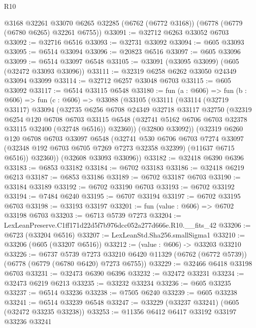 \begin{lexlean}{R10}
\begin{coremodule}
    @3168
    @32261
    @33070
    @6265
    @32285
    (@6762 (@6772 @3168))
    (@6778 (@6779 (@6780 @6265) @32261 @6755))
@33091 := @32712 @6263 @33052 @6703
@33092 := @32716 @6516
@33093 := @32731 @33092
@33094 := @605 @33093
@33095 := @6514 @33094
@33096 := @20823 @6516
@33097 := @605 @33096
@33099 := @6514 @33097 @6548
@33105 := @33091 (@33095 @33099) (@605 (@32472 @33093 @33096))
@33111 := @32319 @6258 @6262 @33050 @24349 @33094 @33099
@33114 := @32712 @6257 @33048 @6703
@33115 := @605 @33092
@33117 := @6514 @33115 @6548
@33180 := fun (a : @606) =>
  fun (b : @606) =>
  fun (c : @606) =>
  @33088
    (@33105
      (@33111
        (@33114
          (@32719 @33117)
          @33094
          (@32735
            @6256
            @6708
            @24349
            @32718
            @33117
            @32750
            (@32319
              @6254
              @120
              @6708
              @6703
              @33115
              @6548
              (@32741 @5162 @6706 @6703 @32378 @33115 @32400 (@32748 @6516))
              @32360))
          (@32800 @33092))
        (@32319
          @6260
          @120
          @6708
          @6703
          @33097
          @6548
          (@32741
            @530
            @6706
            @6703
            @7274
            @33097
            (@32348 @192 @6703 @6705 @7269 @7273 @32358 @32399)
            (@11637 @6715 @6516))
          @32360))
      (@32608 @33093 @33096))
@33182 := @32418 @6390 @6396
@33183 := @6853 @33182
@33184 := @6702 @33183
@33186 := @32418 @6219 @6213
@33187 := @6853 @33186
@33189 := @6702 @33187 @6703
@33190 := @33184 @33189
@33192 := @6702 @33190 @6703
@33193 := @6702 @33192
@33194 := @7484 @6240
@33195 := @6707 @33194
@33197 := @6702 @33195 @6703
@33198 := @33193 @33197
@33201 := fun (value : @606) => @6702 @33198 @6703
@33203 := @6713 @5739 @7273
@33204 := LexLeanPreserve.C1ff171d22d5f7b976dcc052a277d666e.R10.__fits_42
@33206 := @6723 (@33204 @6516)
@33207 := LexLeanStd.Sha256.smallSigma1
@33210 := @33206 (@605 (@33207 @6516))
@33212 := (value : @606) -> @33203 @33210
@33226 := @6737
    @5739
    @7273
    @33210
    @6420
    @11329
    (@6762 (@6772 @5739))
    (@6778 (@6779 (@6780 @6420) @7273 @6755))
@33229 := @32466 @6418 @33198 @6703
@33231 := @32473 @6390 @6396
@33232 := @32472 @33231
@33234 := @32473 @6219 @6213
@33235 := @33232 @33234
@33236 := @605 @33235
@33237 := @6514 @33236
@33238 := @7505 @6240
@33239 := @605 @33238
@33241 := @6514 @33239 @6548
@33247 := @33229 (@33237 @33241) (@605 (@32472 @33235 @33238))
@33253 := @11356 @6412 @6417 @33192 @33197 @33236 @33241

\end{coremodule}
\end{lexlean}
